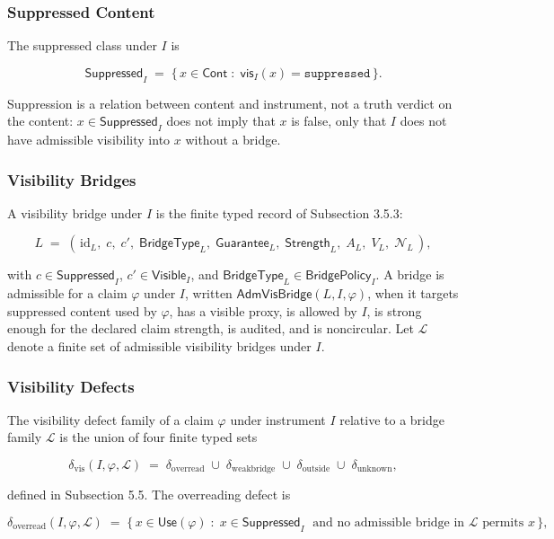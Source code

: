 \documentclass[11pt]{article}
\theoremstyle{definition}
\begin{document}
\subsubsection{Suppressed Content}

The suppressed class under \(I\) is

\[
\mathsf{Suppressed}_I\;=\;\{\,x\in\mathsf{Cont}\;:\;\mathsf{vis}_I(x)=\texttt{suppressed}\,\}.
\]

Suppression is a relation between content and instrument, not a truth verdict on the content: \(x\in\mathsf{Suppressed}_I\) does not imply that \(x\) is false, only that \(I\) does not have admissible visibility into \(x\) without a bridge.

\subsubsection{Visibility Bridges}

A visibility bridge under \(I\) is the finite typed record of Subsection 3.5.3:

\[
L\;=\;(\,\mathrm{id}_L,\;c,\;c',\;\mathsf{BridgeType}_L,\;\mathsf{Guarantee}_L,\;\mathsf{Strength}_L,\;A_L,\;V_L,\;\mathcal N_L\,),
\]

with \(c\in\mathsf{Suppressed}_I\), \(c'\in\mathsf{Visible}_I\), and \(\mathsf{BridgeType}_L\in\mathsf{BridgePolicy}_I\). A bridge is admissible for a claim \(\varphi\) under \(I\), written \(\mathsf{AdmVisBridge}(L,I,\varphi)\), when it targets suppressed content used by \(\varphi\), has a visible proxy, is allowed by \(I\), is strong enough for the declared claim strength, is audited, and is noncircular. Let \(\mathcal L\) denote a finite set of admissible visibility bridges under \(I\).

\subsubsection{Visibility Defects}

The visibility defect family of a claim \(\varphi\) under instrument \(I\) relative to a bridge family \(\mathcal L\) is the union of four finite typed sets

\[
\delta_{\mathrm{vis}}(I,\varphi,\mathcal L)\;=\;\delta_{\mathrm{overread}}\;\cup\;\delta_{\mathrm{weakbridge}}\;\cup\;\delta_{\mathrm{outside}}\;\cup\;\delta_{\mathrm{unknown}},
\]

defined in Subsection 5.5. The overreading defect is

\[
\delta_{\mathrm{overread}}(I,\varphi,\mathcal L)\;=\;\{\,x\in\mathsf{Use}(\varphi)\;:\;x\in\mathsf{Suppressed}_I\;\text{ and no admissible bridge in }\mathcal L\text{ permits }x\,\},
\]
\end{document}
